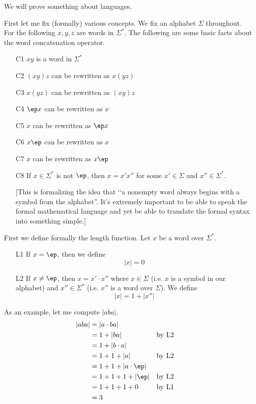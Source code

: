 


\renewcommand\TITLE{Assignment 4}

\renewcommand\AUTHOR{John Doe ?}
\renewcommand\EMAIL{jdoe1@gmail.com ?}


\topmatter

We will prove something about languages.

First let me fix (formally) various concepts.
We fix an alphabet $\Sigma$ throughout.
For the following $x,y,z$ are words in $\Sigma^*$.
The following are some basic facts about the word concatenation operator.
\begin{enumerate}
\item[C1] $xy$ is a word in $\Sigma^*$
\item[C2] $(xy)z$ can be rewritten as $x(yz)$
\item[C3] $x(yz)$ can be rewritten as $(xy)z$
\item[C4] $\ep x$ can be rewritten as $x$
\item[C5] $x$ can be rewritten as $\ep x$
\item[C6] $x\ep$ can be rewritten as $x$
\item[C7] $x$ can be rewritten as $x\ep$
\item[C8] If $x \in \Sigma^*$ is not $\ep$, then 
$x = x'x''$ for some $x' \in \Sigma$ and $x'' \in \Sigma^*$.

[This is formalizing the idea that 
\lq\lq a nonempty word always begins with a symbol from the alphabet''.
It's extremely important to be able to speak the formal
mathematical language and yet be able to translate the formal 
syntax into something simple.]
\end{enumerate}

\newpage
First we define formally the length function.
Let $x$ be a word over $\Sigma^*$.
\begin{enumerate}
\item[L1] If $x = \ep$, then we define
\[
|x| = 0
\]
\item[L2] If $x \neq \ep$, then $x = x' \cdot x''$ where
$x \in \Sigma$ (i.e. $x$ is a symbol in our alphabet)
and $x'' \in \Sigma^*$ (i.e. $x''$ is a word over $\Sigma$).
We define 
\[
|x| = 1 + |x''|
\]
\end{enumerate}
As an example, let me compute $|aba|$.
\begin{align*}
|aba| 
&= |a \cdot ba|                           \\
&= 1 + |ba|              & & \text{by L2} \\
&= 1 + |b \cdot a|                        \\
&= 1 + 1 + |a|           & & \text{by L2} \\
&= 1 + 1 + |a \cdot \ep| & &              \\
&= 1 + 1 + 1 + |\ep|     & & \text{by L2} \\
&= 1 + 1 + 1 + 0         & & \text{by L1} \\
&= 3 
\end{align*}

